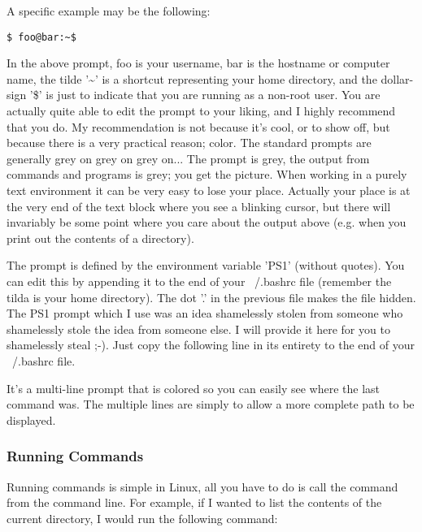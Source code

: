 A specific example may be the following: \\

\begin{lstlisting}
$ foo@bar:~$
\end{lstlisting}
	
In the above prompt, foo is your username, bar is the hostname or computer name, the tilde '\textasciitilde'  is a shortcut representing your home directory, and the dollar-sign '\$' is just to indicate that you are running as a non-root user.  You are actually quite able to edit the prompt to your liking, and I highly recommend that you do.  My recommendation is not because it's cool, or to show off, but because there is a very practical reason; color.  The standard prompts are generally grey on grey on grey on...  The prompt is grey, the output from commands and programs is grey; you get the picture.  When working in a purely text environment it can be very easy to lose your place.  Actually your place is at the very end of the text block where you see a blinking cursor, but there will invariably be some point where you care about the output above (e.g. when you print out the contents of a directory).

The prompt is defined by the environment variable 'PS1' (without quotes).  You can edit this by appending it to the end of your ~/.bashrc file (remember the tilda is your home directory).  The dot '.' in the previous file makes the file hidden.  The PS1 prompt which I use was an idea shamelessly stolen from someone who shamelessly stole the idea from someone else.  I will provide it here for you to shamelessly steal ;-).  Just copy the following line in its entirety to the end of your ~/.bashrc file.

	
It's a multi-line prompt that is colored so you can easily see where the last command was.  The multiple lines are simply to allow a more complete path to be displayed.


\subsubsection{Running Commands}
\mdseries \noindent Running commands is simple in Linux, all you have to do is call the command from the command line.  For example, if I wanted to list the contents of the current directory, I would run the following command:

